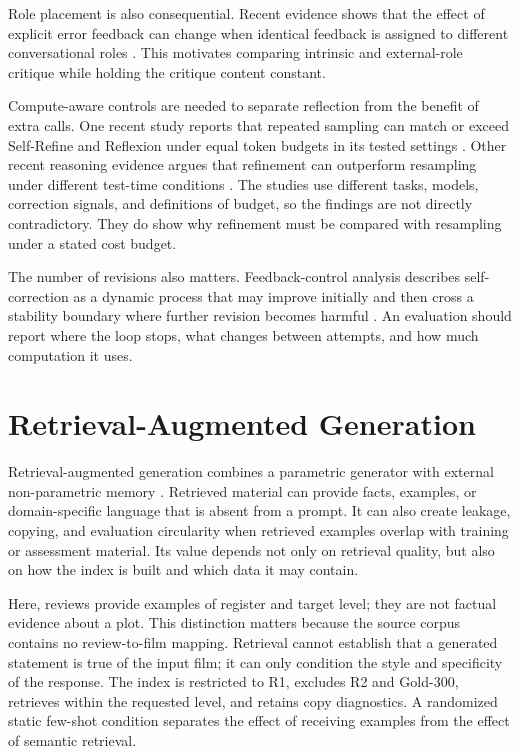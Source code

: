 Role placement is also consequential. Recent evidence shows that the effect of explicit error feedback can change when identical feedback is assigned to different conversational roles \cite{b15}. This motivates comparing intrinsic and external-role critique while holding the critique content constant.

Compute-aware controls are needed to separate reflection from the benefit of extra calls. One recent study reports that repeated sampling can match or exceed Self-Refine and Reflexion under equal token budgets in its tested settings \cite{b16}. Other recent reasoning evidence argues that refinement can outperform resampling under different test-time conditions \cite{b17}. The studies use different tasks, models, correction signals, and definitions of budget, so the findings are not directly contradictory. They do show why refinement must be compared with resampling under a stated cost budget.

The number of revisions also matters. Feedback-control analysis describes self-correction as a dynamic process that may improve initially and then cross a stability boundary where further revision becomes harmful \cite{b18}. An evaluation should report where the loop stops, what changes between attempts, and how much computation it uses.

\section{Retrieval-Augmented Generation}
\label{sec:retrieval-augmented-generation}

Retrieval-augmented generation combines a parametric generator with external non-parametric memory \cite{b8}. Retrieved material can provide facts, examples, or domain-specific language that is absent from a prompt. It can also create leakage, copying, and evaluation circularity when retrieved examples overlap with training or assessment material. Its value depends not only on retrieval quality, but also on how the index is built and which data it may contain.

Here, reviews provide examples of register and target level; they are not factual evidence about a plot. This distinction matters because the source corpus contains no review-to-film mapping. Retrieval cannot establish that a generated statement is true of the input film; it can only condition the style and specificity of the response. The index is restricted to R1, excludes R2 and Gold-300, retrieves within the requested level, and retains copy diagnostics. A randomized static few-shot condition separates the effect of receiving examples from the effect of semantic retrieval.

